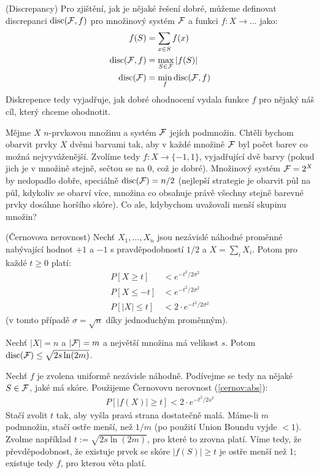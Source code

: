 \df (Discrepancy) Pro zjištění, jak je nějaké řešení dobré, můžeme definovat 
discrepanci $\operatorname{disc}(\mathcal{F},f)$ pro množinový systém $\mathcal{F}$ a funkci $f: X \to \dots$ 
jako:
\begin{align}
	f(S) &= \sum_{x\in S} f(x) \\
	\operatorname{disc}(\mathcal{F},f) &= \max_{S\in \mathcal{F}} |f(S)| \\
	\operatorname{disc}(\mathcal{F}) &= \min_f \operatorname{disc}(\mathcal{F},f)
\end{align}
Diskrepence tedy vyjadřuje, jak dobré ohodnocení vydala funkce $f$ pro nějaký 
náš cíl, který chceme ohodnotit.

\app Mějme $X$ $n$-prvkovou množinu a systém $\mathcal{F}$ jejích podmnožin. Chtěli 
bychom obarvit prvky $X$ dvěmi barvami tak, aby v každé množině $\mathcal{F}$ byl počet 
barev co možná nejvyváženější. Zvolíme tedy $f: X \to \{-1, 1\}$, vyjadřující 
dvě barvy (pokud jich je v množině stejně, sečtou se na 0, což je dobré).  
Množinový systém $\mathcal{F} = 2^X$ by nedopadlo dobře, speciálně $\operatorname{disc}(\mathcal{F}) = n/2$ 
(nejlepší strategie je obarvit půl na půl, kdykoliv se obarví více, množina co 
obsahuje právě všechny stejně barevné prvky dosáhne horšího skóre). Co ale, 
kdybychom uvažovali menší skupinu množin?

\tv (Černovova nerovnost) Nechť $X_1, \dots, X_n$ jsou nezávislé náhodné 
proměnné nabývající hodnot $+1$ a $-1$ s pravděpodobností $1/2$ a $X = \sum_i 
X_i$. Potom pro každé $t \geq 0$ platí:
\begin{align}
	P[X \geq t] &< e^{-t^2/2\sigma^2} \\
	P[X \leq -t] &< e^{-t^2/2\sigma^2}\\
	\label{cernov:abs} P[|X| \leq t] &< 2\cdot e^{-t^2/2\sigma^2}
\end{align}
(v tomto případě $\sigma = \sqrt{n}$ díky jednoduchým proměnným).


\tv Nechť $|X|=n$ a $|\mathcal{F}| = m$ a největší množina má velikost $s$.  Potom 
$\operatorname{disc}(\mathcal{F}) \leq \sqrt{2s\ln(2m)}$.

\dk Nechť $f$ je zvolena uniformě nezávisle náhodně. Podívejme se tedy na nějaké
$S \in \mathcal{F}$, jaké má skóre. Použijeme Černovovu nerovnost (\ref{cernov:abs}):
\begin{align}
	P[|f(X)| \geq t] < 2 \cdot e^{-t^2/2s^2}
\end{align}
Stačí zvolit $t$ tak, aby vyšla pravá strana dostatečně malá. Máme-li $m$ 
podmnožin, stačí ostře menší, než $1/m$ (po použití Union Boundu vyjde $< 1$).  
Zvolme například $t := \sqrt{2s\ln(2m)}$, pro které to zrovna platí. Víme tedy, 
že převděpodobnost, že existuje prvek se skóre $|f(S)| \geq t$ je ostře menší 
než 1; existuje tedy $f$, pro kterou věta platí.


